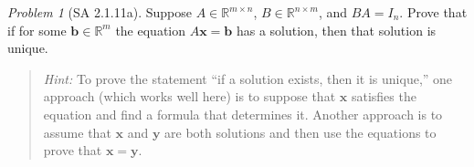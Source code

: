\documentclass[fleqn,11pt]{paper}
\theoremstyle{remark}
\newtheorem{problem}{Problem}
\newcommand\R{\mathbb{R}}
\renewcommand{\vec}[1]{\mathbf{#1}}
\newcommand\vb{\vec{b}}
\newcommand\vx{\vec{x}}
\newcommand\vy{\vec{y}}
\newcommand\vzero{\vec{0}}
\begin{document}
\newpage


  



\begin{problem}[SA 2.1.11a]
  Suppose $A \in \R^{m\times n}$,
  $B \in \R^{n\times m}$, and $BA = I_n$.
  Prove that if for some $\vb \in \R^m$ the
  equation $A\vx = \vb$ has a solution, then that solution is unique.
  \begin{quote}
    {\it Hint:}
    To prove the statement ``if a solution exists, then it is unique,'' one approach (which works well
    here) is to suppose that $\vx$ satisfies the equation and find a formula
    that determines it. Another approach is to assume that $\vx$ and $\vy$ are
    both solutions and then use the equations to prove that $\vx = \vy$.
  \end{quote}
  
\end{problem}


\end{document}
